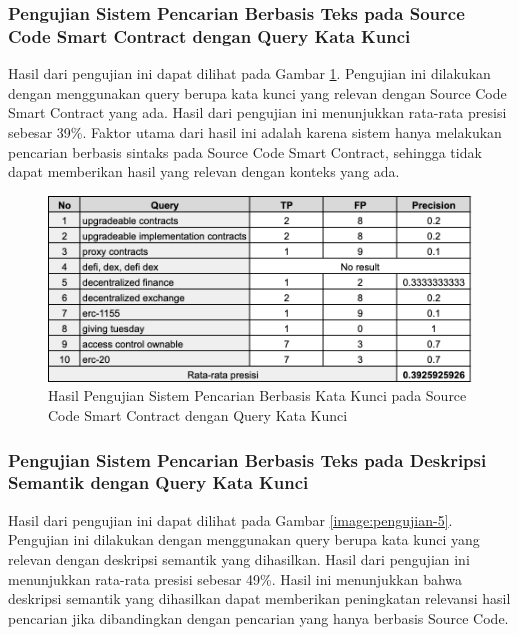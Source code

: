 \subsubsection{Pengujian Sistem Pencarian Berbasis Teks pada Source Code Smart Contract dengan Query Kata Kunci}

Hasil dari pengujian ini dapat dilihat pada Gambar \ref{image:pengujian-4}. Pengujian ini dilakukan dengan menggunakan query berupa kata kunci yang relevan dengan Source Code Smart Contract yang ada. Hasil dari pengujian ini menunjukkan rata-rata presisi sebesar 39\%. Faktor utama dari hasil ini adalah karena sistem hanya melakukan pencarian berbasis sintaks pada Source Code Smart Contract, sehingga tidak dapat memberikan hasil yang relevan dengan konteks yang ada.

\begin{figure}[ht]
	\centering
	\includegraphics[width=1\textwidth]{resources/chapter-4/data-1-4.png}
	\caption{Hasil Pengujian Sistem Pencarian Berbasis Kata Kunci pada Source Code Smart Contract dengan Query Kata Kunci}
	\label{image:pengujian-4}
\end{figure}

\subsubsection{Pengujian Sistem Pencarian Berbasis Teks pada Deskripsi Semantik dengan Query Kata Kunci}

Hasil dari pengujian ini dapat dilihat pada Gambar \ref{image:pengujian-5}. Pengujian ini dilakukan dengan menggunakan query berupa kata kunci yang relevan dengan deskripsi semantik yang dihasilkan. Hasil dari pengujian ini menunjukkan rata-rata presisi sebesar 49\%. Hasil ini menunjukkan bahwa deskripsi semantik yang dihasilkan dapat memberikan peningkatan relevansi hasil pencarian jika dibandingkan dengan pencarian yang hanya berbasis Source Code.

